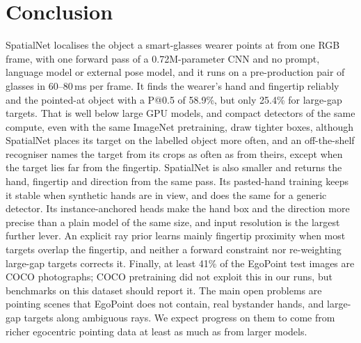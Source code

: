 \section{Conclusion}\label{sec:conclusion}
SpatialNet localises the object a smart-glasses wearer points at from one RGB frame, with one forward pass of a 0.72M-parameter CNN and no prompt, language model or external pose model, and it runs on a pre-production pair of glasses in 60--80\,ms per frame. It finds the wearer's hand and fingertip reliably and the pointed-at object with a P@0.5 of 58.9\%, but only 25.4\% for large-gap targets. That is well below large GPU models, and compact detectors of the same compute, even with the same ImageNet pretraining, draw tighter boxes, although SpatialNet places its target on the labelled object more often, and an off-the-shelf recogniser names the target from its crops as often as from theirs, except when the target lies far from the fingertip. SpatialNet is also smaller and returns the hand, fingertip and direction from the same pass. Its pasted-hand training keeps it stable when synthetic hands are in view, and does the same for a generic detector. Its instance-anchored heads make the hand box and the direction more precise than a plain model of the same size, and input resolution is the largest further lever. An explicit ray prior learns mainly fingertip proximity when most targets overlap the fingertip, and neither a forward constraint nor re-weighting large-gap targets corrects it. Finally, at least 41\% of the EgoPoint test images are COCO photographs; COCO pretraining did not exploit this in our runs, but benchmarks on this dataset should report it. The main open problems are pointing scenes that EgoPoint does not contain, real bystander hands, and large-gap targets along ambiguous rays. We expect progress on them to come from richer egocentric pointing data at least as much as from larger models.
